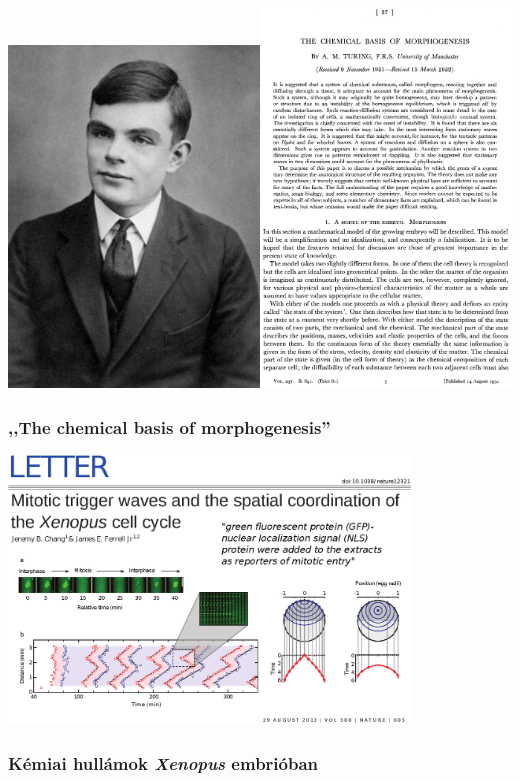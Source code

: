 \documentclass{beamer}
\begin{document}
\begin{frame}
	\centering
	\includegraphics[width=0.5\textwidth]{turing.jpg}\includegraphics[width=0.5\textwidth]{morpho.eps}

	\frametitle{,,The chemical basis of morphogenesis''}
\end{frame}

\begin{frame}
	\centering
	\includegraphics[width=0.8\textwidth]{chang.eps}
	\frametitle{Kémiai hullámok \emph{Xenopus} embrióban}
\end{frame}
\end{document}
